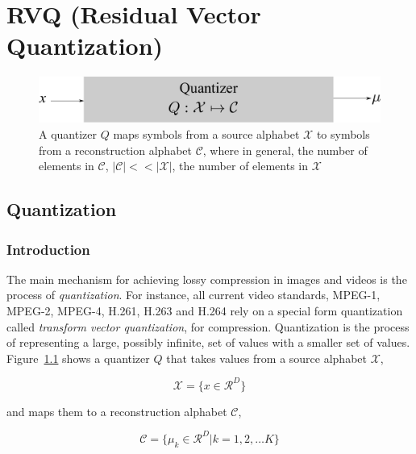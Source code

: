 \chapter{RVQ (Residual Vector Quantization)}
\label{chap_RVQ}	

\begin{figure}[htp]			
	\includegraphics[width=1\textwidth]{thesis/Quantization_blockDiagram.pdf}
	\caption{A quantizer $Q$ maps symbols from a source alphabet $\mathcal{X}$ to symbols from a reconstruction alphabet $\mathcal{C}$, where in general, the number of elements in $\mathcal{C}$, $|\mathcal{C}| << |\mathcal{X}|$, the number of elements in $\mathcal{X}$ }
	\label{fig:Quantization_block_diagram}
\end{figure}

\section{Quantization}
\subsection{Introduction}
\label{sec:quantization}

The main mechanism for achieving lossy compression in images and videos is the process of \emph{quantization}.  For instance, all current video standards, MPEG-1, MPEG-2, MPEG-4, H.261, H.263 and H.264 rely on a special form quantization called \emph{transform vector quantization}, for compression.  Quantization is the process of representing a large, possibly infinite, set of values with a smaller set of values.  Figure~\ref{fig:Quantization_block_diagram} shows a quantizer $Q$ that takes values from a source alphabet $\mathcal{X}$,

\begin{equation}
\mathcal{X}=\{x \in \mathcal{R}^D\}
\end{equation}

and maps them to a reconstruction alphabet $\mathcal{C}$, 

\begin{equation}
\mathcal{C}=\{\mu_k \in \mathcal{R}^D | k=1,2, \ldots K\}
\end{equation}

